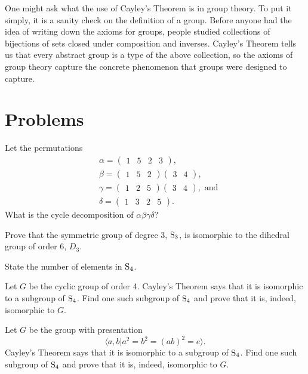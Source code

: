 One might ask what the use of Cayley's Theorem is in group theory. To put it simply, it is a sanity check on the definition of a group. Before anyone had the idea of writing down the axioms for groups, people studied collections of bijections of sets closed under composition and inverses. Cayley's Theorem tells us that every abstract group is a type of the above collection, so the axioms of group theory capture the concrete phenomenon that groups were designed to capture.

\newpage

\section{Problems}
\begin{problem}
    Let the permutations
    \begin{align*}
        &\alpha = \begin{pmatrix}1 & 5 & 2 & 3\end{pmatrix},\\
        &\beta  = \begin{pmatrix}1 & 5 & 2\end{pmatrix}\begin{pmatrix}3 & 4\end{pmatrix},\\
        &\gamma = \begin{pmatrix}1 & 2 & 5\end{pmatrix}\begin{pmatrix}3 & 4\end{pmatrix}, \text{ and}\\
        &\delta = \begin{pmatrix}1 & 3 & 2 & 5\end{pmatrix}.
    \end{align*}
    What is the cycle decomposition of $\alpha\beta\gamma\delta$?
\end{problem}

\begin{problem}
    Prove that the symmetric group of degree 3, $\mathrm{S}_{3}$, is isomorphic to the dihedral group of order 6, $D_3$.
\end{problem}

\begin{problem}
    State the number of elements in $\mathrm{S}_{4}$.
    \begin{partquestions}{\alph*}
        \item Let $G$ be the cyclic group of order 4. Cayley's Theorem says that it is isomorphic to a subgroup of $\mathrm{S}_{4}$. Find one such subgroup of $\mathrm{S}_{4}$ and prove that it is, indeed, isomorphic to $G$.
        \item Let $G$ be the group with presentation
        \[
            \langle a, b \vert a^2 = b^2 = (ab)^2 = e \rangle.
        \]
        Cayley's Theorem says that it is isomorphic to a subgroup of $\mathrm{S}_{4}$. Find one such subgroup of $\mathrm{S}_{4}$ and prove that it is, indeed, isomorphic to $G$.
    \end{partquestions}
\end{problem}
